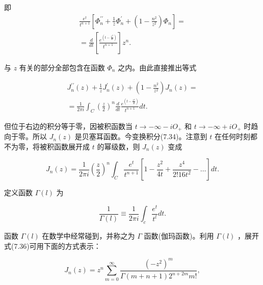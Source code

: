 即
\begin{equation*}
\begin{array}{l} \frac {e ^ {t}}{t ^ {n + 1}} \left[ \Phi_ {n} ^ {\prime \prime} + \frac {1}{z} \Phi_ {n} ^ {\prime} + \left(1 - \frac {n ^ {2}}{z ^ {2}}\right) \Phi_ {n} \right] = \\ = \frac {d}{d t} \left[ \frac {e ^ {(t - \frac {z ^ {2}}{4 t})}}{t ^ {n + 1}} \right] z ^ {n}. \end{array}
\end{equation*}

与 $z$ 有关的部分全部包含在函数 $\Phi_{n}$ 之内。由此直接推出等式

\begin{equation*}
\begin{array}{l} J _ {n} ^ {\prime \prime} (z) + \frac {1}{z} J _ {n} ^ {\prime} (z) + \left(1 - \frac {n ^ {2}}{z ^ {2}}\right) J _ {n} (z) = \\ = \frac {1}{2 \pi i} \int_ {C} \left(\frac {z}{2}\right) ^ {n} \frac {d}{d t} \frac {e ^ {(t - \frac {z ^ {2}}{4 t})}}{t ^ {n + 1}} d t. \end{array}
\end{equation*}

但位于右边的积分等于零，因被积函数当 $t \to -\infty - iO_{+}$ 和 $t \to -\infty + iO_{+}$ 时趋向于零。所以 $J_{n}(z)$ 是贝塞耳函数。今变换积分(7.34)。注意到 $t$ 在任何时刻都不为零，将被积函数展开成 $t$ 的幂级数，则 $J_{n}(z)$ 变成

\begin{equation*}
J _ {n} (z) = \frac {1}{2 \pi i} \left(\frac {z}{2}\right) ^ {n} \int_ {C} \frac {e ^ {t}}{t ^ {n + 1}} \left[ 1 - \frac {z ^ {2}}{4 t} + \frac {z ^ {4}}{2 ! 1 6 t ^ {2}} - \dots \right] d t.\tag{7.36}
\end{equation*}

定义函数 $\Gamma(l)$ 为

\begin{equation*}
\frac {1}{\Gamma (l)} \equiv \frac {1}{2 \pi i} \int_ {c} \frac {e ^ {t}}{t ^ {l}} d t.\tag{7.37}
\end{equation*}

函数 $\Gamma(l)$ 在数学中经常碰到，并称之为 $\Gamma$ 函数(伽玛函数)。利用 $\Gamma(l)$ ，展开式(7.36)可用下面的方式表示：

\begin{equation*}
J _ {n} (z) = z ^ {n} \sum_ {m = 0} ^ {\infty} \frac {(- z ^ {2}) ^ {m}}{\Gamma (m + n + 1) 2 ^ {n + 2 m} m !},
\end{equation*}

